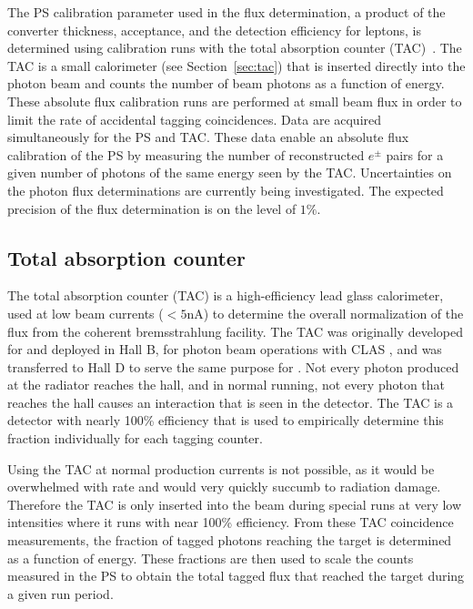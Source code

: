 The PS calibration parameter used in the flux determination, a product
of the  converter thickness, acceptance, and the detection efficiency
for leptons, is determined using calibration runs with the total 
absorption counter (TAC)~\cite{somov_flux}. The TAC is a small calorimeter
(see Section~\ref{sec:tac}) that is inserted directly into the photon
beam and counts the number of beam photons as a function of energy.
These absolute flux calibration runs are performed at small beam flux in
order to limit the rate of accidental tagging coincidences.
Data are acquired simultaneously for the PS and TAC.
These data enable an absolute flux calibration of the PS
by measuring the number of reconstructed $e^{\pm}$ pairs for a given
number of photons of the same energy seen by the TAC. 
Uncertainties on the photon flux determinations are currently being
investigated. The expected precision of the flux determination is on
the level of $1\%$.

\subsection{Total absorption counter \label{sec:tac}}
The total absorption counter (TAC) is a high-efficiency lead glass
calorimeter, used at low beam currents ($<5$nA) to determine the overall
normalization of the flux from the \GX{} coherent bremsstrahlung facility.
The TAC was originally developed for and deployed in Hall B, for
photon beam operations with CLAS
\cite{clasnote1992014, clasnote1993011,clasnote1999002},
and was transferred to Hall D to serve the same purpose for \GX{}.
Not every photon produced at the radiator reaches the hall, and in
normal \GX{} running, not every photon that reaches the hall causes
an interaction that is seen in the \GX{} detector. The TAC is a
detector with nearly 100\% efficiency that is used to empirically
determine this fraction individually for each tagging counter.

Using the TAC at normal \GX{} production currents is not possible,
as it would be overwhelmed with rate and would very quickly succumb
to radiation damage. Therefore the TAC is only inserted into the
beam during special runs at very low intensities where it runs
with near 100\% efficiency.
From these TAC coincidence measurements, the fraction of tagged photons
reaching the \GX{} target is determined as a function of energy.
These fractions are then used to scale the counts measured in the
PS to obtain the total tagged flux that reached the \GX{} target during
a given run period.



